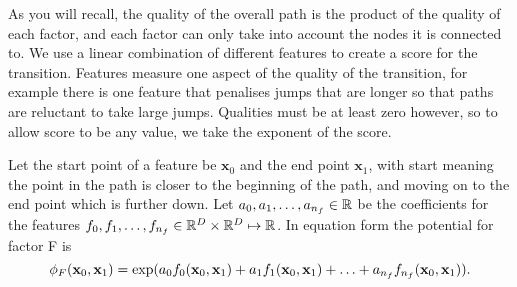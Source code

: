 As you will recall, the quality of the overall path is the product of the quality of each factor, and each factor can only take into account the nodes it is connected to.
We use a linear combination of different features to create a score for the transition.
Features measure one aspect of the quality of the transition, for example there is one feature that penalises jumps that are longer so that paths are reluctant to take large jumps.
Qualities must be at least zero however, so to allow score to be any value, we take the exponent of the score.

Let the start point of a feature be $\mathbf{x}_0$ and the end point $\mathbf{x}_1$, with start meaning the point in the path is closer to the beginning of the path, and moving on to the end point which is further down.
Let $a_0, a_1, \mathellipsis, a_{n_f} \in \mathbb{R}$ be the coefficients for the features $f_0, f_1, \mathellipsis, f_{n_f} \in \mathbb{R}^D \times \mathbb{R}^D \mapsto \mathbb{R}$.
In equation form the potential for factor F is
\begin{equation}
    \label{eq:factor_qual}
    \phi_F(\mathbf{x}_0, \mathbf{x}_1) = \exp(a_0 f_0(\mathbf{x}_0, \mathbf{x}_1) + a_1 f_1(\mathbf{x}_0, \mathbf{x}_1) + \mathellipsis + a_{n_f} f_{n_f} (\mathbf{x}_0, \mathbf{x}_1)).
\end{equation}

